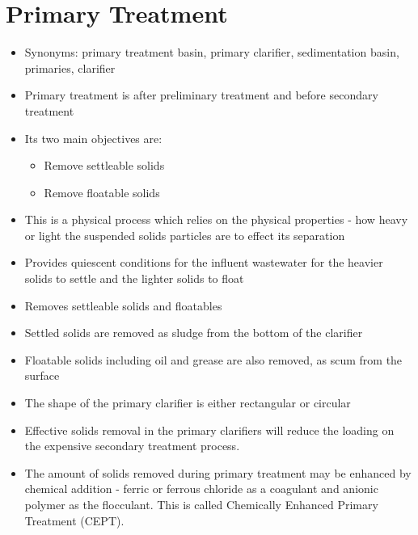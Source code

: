 
\chapter{Primary Treatment}

\begin{itemize}
\item Synonyms:  primary treatment basin, primary clarifier, sedimentation basin, primaries, clarifier

	
		\item Primary treatment is after preliminary treatment and 				before secondary treatment
		\item Its two main objectives are: 
			\begin{itemize}
				\item Remove settleable solids
				\item Remove floatable solids
			\end{itemize}
		\item This is a physical process which relies on the physical 			properties - how heavy or light the suspended solids particles 		are to effect its separation
		\item Provides quiescent conditions for the influent 					wastewater for the heavier solids to settle and the lighter 			solids to float
		\item Removes settleable solids and floatables
		\item Settled solids are removed as sludge from the bottom of 			the clarifier
		\item Floatable solids including oil and grease are also 				removed, as scum from the surface\\
		\item The shape of the primary clarifier is either rectangular 		or circular
	
		\item Effective solids removal in the primary clarifiers will 			reduce the loading on the expensive secondary treatment 				process.
		\item The amount of solids removed during primary treatment 			may be enhanced by chemical addition - ferric or ferrous 				chloride as a coagulant and anionic polymer as the flocculant.  		This is called Chemically Enhanced Primary Treatment (CEPT).


\end{itemize}
